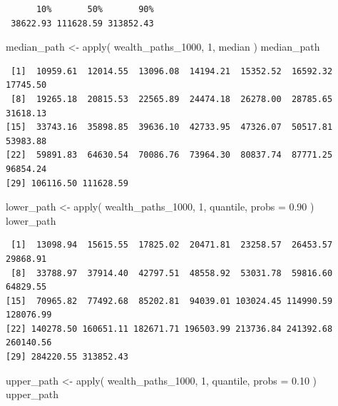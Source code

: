 \documentclass[
  letterpaper,
  DIV=11,
  numbers=noendperiod]{scrartcl}
\newenvironment{Shaded}{\begin{snugshade}}{\end{snugshade}}
\newcommand{\AttributeTok}[1]{\textcolor[rgb]{0.40,0.45,0.13}{#1}}
\newcommand{\DecValTok}[1]{\textcolor[rgb]{0.68,0.00,0.00}{#1}}
\newcommand{\FloatTok}[1]{\textcolor[rgb]{0.68,0.00,0.00}{#1}}
\newcommand{\FunctionTok}[1]{\textcolor[rgb]{0.28,0.35,0.67}{#1}}
\newcommand{\NormalTok}[1]{\textcolor[rgb]{0.00,0.23,0.31}{#1}}
\newcommand{\OtherTok}[1]{\textcolor[rgb]{0.00,0.23,0.31}{#1}}
\begin{document}
\begin{verbatim}
      10%       50%       90% 
 38622.93 111628.59 313852.43 
\end{verbatim}

\begin{Shaded}
\begin{Highlighting}[]
\NormalTok{median\_path }\OtherTok{\textless{}{-}} \FunctionTok{apply}\NormalTok{(}
\NormalTok{    wealth\_paths\_1000,}
    \DecValTok{1}\NormalTok{,}
\NormalTok{    median}
\NormalTok{)    }
\NormalTok{median\_path}
\end{Highlighting}
\end{Shaded}

\begin{verbatim}
 [1]  10959.61  12014.55  13096.08  14194.21  15352.52  16592.32  17745.50
 [8]  19265.18  20815.53  22565.89  24474.18  26278.00  28785.65  31618.13
[15]  33743.16  35898.85  39636.10  42733.95  47326.07  50517.81  53983.88
[22]  59891.83  64630.54  70086.76  73964.30  80837.74  87771.25  96854.24
[29] 106116.50 111628.59
\end{verbatim}

\begin{Shaded}
\begin{Highlighting}[]
\NormalTok{lower\_path }\OtherTok{\textless{}{-}} \FunctionTok{apply}\NormalTok{(}
\NormalTok{    wealth\_paths\_1000,}
    \DecValTok{1}\NormalTok{,}
\NormalTok{    quantile,}
    \AttributeTok{probs =} \FloatTok{0.90}
\NormalTok{)}
\NormalTok{lower\_path}
\end{Highlighting}
\end{Shaded}

\begin{verbatim}
 [1]  13098.94  15615.55  17825.02  20471.81  23258.57  26453.57  29868.91
 [8]  33788.97  37914.40  42797.51  48558.92  53031.78  59816.60  64829.55
[15]  70965.82  77492.68  85202.81  94039.01 103024.45 114990.59 128076.99
[22] 140278.50 160651.11 182671.71 196503.99 213736.84 241392.68 260140.56
[29] 284220.55 313852.43
\end{verbatim}

\begin{Shaded}
\begin{Highlighting}[]
\NormalTok{upper\_path }\OtherTok{\textless{}{-}} \FunctionTok{apply}\NormalTok{(}
\NormalTok{    wealth\_paths\_1000,}
    \DecValTok{1}\NormalTok{,}
\NormalTok{    quantile,}
    \AttributeTok{probs =} \FloatTok{0.10}
\NormalTok{)}
\NormalTok{upper\_path}
\end{Highlighting}
\end{Shaded}
\end{document}
